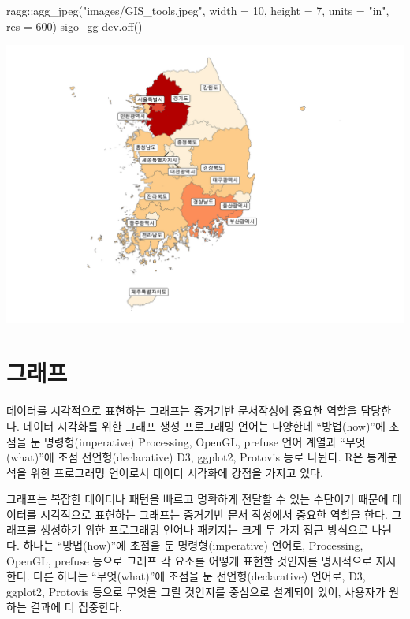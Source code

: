 \documentclass[
  letterpaper,
]{book}
\newenvironment{Shaded}{\begin{snugshade}}{\end{snugshade}}
\newcommand{\AttributeTok}[1]{\textcolor[rgb]{0.40,0.45,0.13}{#1}}
\newcommand{\DecValTok}[1]{\textcolor[rgb]{0.68,0.00,0.00}{#1}}
\newcommand{\FunctionTok}[1]{\textcolor[rgb]{0.28,0.35,0.67}{#1}}
\newcommand{\NormalTok}[1]{\textcolor[rgb]{0.00,0.23,0.31}{#1}}
\newcommand{\SpecialCharTok}[1]{\textcolor[rgb]{0.37,0.37,0.37}{#1}}
\newcommand{\StringTok}[1]{\textcolor[rgb]{0.13,0.47,0.30}{#1}}
\begin{document}
\begin{Shaded}
\begin{Highlighting}[]
\NormalTok{ragg}\SpecialCharTok{::}\FunctionTok{agg\_jpeg}\NormalTok{(}\StringTok{"images/GIS\_tools.jpeg"}\NormalTok{,}
               \AttributeTok{width =} \DecValTok{10}\NormalTok{, }\AttributeTok{height =} \DecValTok{7}\NormalTok{, }\AttributeTok{units =} \StringTok{"in"}\NormalTok{, }\AttributeTok{res =} \DecValTok{600}\NormalTok{)}
\NormalTok{sigo\_gg}
\FunctionTok{dev.off}\NormalTok{()}
\end{Highlighting}
\end{Shaded}

\includegraphics{images/GIS_tools.jpeg}

\hypertarget{uxadf8uxb798uxd504-1}{%
\section{그래프}\label{uxadf8uxb798uxd504-1}}

데이터를 시각적으로 표현하는 그래프는 증거기반 문서작성에 중요한 역할을
담당한다. 데이터 시각화를 위한 그래프 생성 프로그래밍 언어는 다양한데
``방법(how)''에 초점을 둔 명령형(imperative) Processing, OpenGL, prefuse
언어 계열과 ``무엇(what)''에 초점 선언형(declarative) D3, ggplot2,
Protovis 등로 나뉜다. R은 통계분석을 위한 프로그래밍 언어로서 데이터
시각화에 강점을 가지고 있다.

그래프는 복잡한 데이터나 패턴을 빠르고 명확하게 전달할 수 있는 수단이기
때문에 데이터를 시각적으로 표현하는 그래프는 증거기반 문서 작성에서
중요한 역할을 한다. 그래프를 생성하기 위한 프로그래밍 언어나 패키지는
크게 두 가지 접근 방식으로 나뉜다. 하나는 ``방법(how)''에 초점을 둔
명령형(imperative) 언어로, Processing, OpenGL, prefuse 등으로 그래프 각
요소를 어떻게 표현할 것인지를 명시적으로 지시한다. 다른 하나는
``무엇(what)''에 초점을 둔 선언형(declarative) 언어로, D3, ggplot2,
Protovis 등으로 무엇을 그릴 것인지를 중심으로 설계되어 있어, 사용자가
원하는 결과에 더 집중한다.
\end{document}
